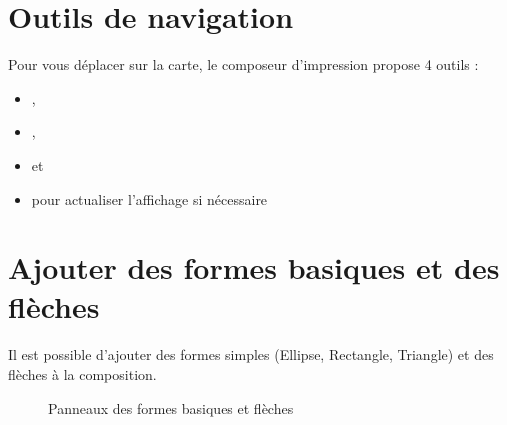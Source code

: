 \section{Outils de navigation}

Pour vous déplacer sur la carte, le composeur d'impression propose 4 outils :

\begin{itemize}[label=--]
\item {},
\item {},
\item {} et
\item {} pour actualiser l'affichage si nécessaire
\end{itemize}

\section{Ajouter des formes basiques et des flèches}

Il est possible d'ajouter des formes simples (Ellipse, Rectangle, Triangle) et des flèches à la composition.

\begin{figure}[ht]
\centering
{}
\hspace{1cm}
\caption{Panneaux des formes basiques et flèches \nixcaption}\label{fig:shapearrow}
\end{figure}

